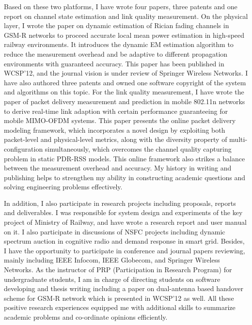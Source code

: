 \documentclass[journal,onecolumn]{IEEEtran}
\begin{document}
Based on these two platforms, I have wrote four papers, three patents and one report on channel state estimation and link quality measurement. On the physical layer, I wrote the paper on dynamic estimation of Rician fading channels in GSM-R networks to proceed accurate local mean power estimation in high-speed railway environments. It introduces the dynamic EM estimation algorithm to reduce the measurement overhead and be adaptive to different propagation environments with guaranteed accuracy. This paper has been published in WCSP'12, and the journal vision is under review of Springer Wireless Networks. I have also authored three patents and owned one software copyright of the system and algorithms on this topic. For the link quality measurement, I have wrote the paper of packet delivery measurement and prediction in mobile 802.11n networks to derive real-time link adaption with certain performance guaranteeing for mobile MIMO-OFDM systems. This paper presents the online packet delivery modeling framework, which incorporates a novel design by exploiting both packet-level and physical-level metrics, along with the diversity property of multi-configuration simultaneously, which overcomes the channel quality capturing problem in static PDR-RSS models. This online framework also strikes a balance between the measurement overhead and accuracy. My history in writing and publishing helps to strengthen my ability in constructing academic questions and solving engineering problems effectively.

In addition, I also participate in research projects including proposals, reports and deliverables. I was responsible for system design and experiments of the key project of Ministry of Railway, and have wrote a research report and user manual on it. I also participate in discussions of NSFC projects including dynamic spectrum auction in cognitive radio and demand response in smart grid. Besides, I have the opportunity to participate in conference and journal papers reviewing, mainly including IEEE Infocom, IEEE Globecom, and Springer Wireless Networks. As the instructor of PRP (Participation in Research Program) for undergraduate students, I am in charge of directing students on software developing and thesis writing including a paper on dual-antenna based handover scheme for GSM-R network which is presented in WCSP'12 as well. All these positive research experiences equipped me with additional skills to summarize academic problems and co-ordinate opinions efficiently.
\end{document}
